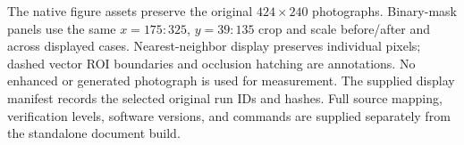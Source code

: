 The native figure assets preserve the original \(424\times240\) photographs. Binary-mask panels use the same \(x=175{:}325\), \(y=39{:}135\) crop and scale before/after and across displayed cases. Nearest-neighbor display preserves individual pixels; dashed vector ROI boundaries and occlusion hatching are annotations. No enhanced or generated photograph is used for measurement. The supplied display manifest records the selected original run IDs and hashes. Full source mapping, verification levels, software versions, and commands are supplied separately from the standalone document build.
